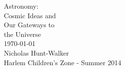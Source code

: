 \begin{center}
\LARGE{Astronomy: \\Cosmic Ideas and\\Our Gateways to\\the Universe}\\
\vspace{2in}
\Large{\today}\\
\vspace{2in}
\Large{Nicholas Hunt-Walker\\Harlem Children's Zone - Summer 2014}
\end{center}